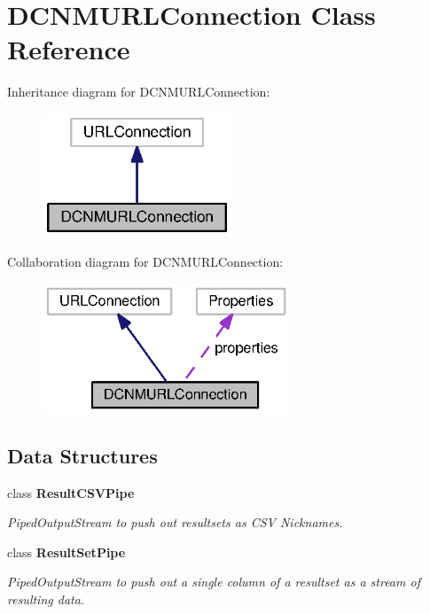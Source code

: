 \section{D\+C\+N\+M\+U\+R\+L\+Connection Class Reference}
\label{classorg_1_1smallfoot_1_1parser_1_1dcnm_1_1DCNMURLConnection}


Inheritance diagram for D\+C\+N\+M\+U\+R\+L\+Connection\+:
\nopagebreak
\begin{figure}[H]
\begin{center}
\leavevmode
\includegraphics[width=160pt]{classorg_1_1smallfoot_1_1parser_1_1dcnm_1_1DCNMURLConnection__inherit__graph}
\end{center}
\end{figure}


Collaboration diagram for D\+C\+N\+M\+U\+R\+L\+Connection\+:
\nopagebreak
\begin{figure}[H]
\begin{center}
\leavevmode
\includegraphics[width=209pt]{classorg_1_1smallfoot_1_1parser_1_1dcnm_1_1DCNMURLConnection__coll__graph}
\end{center}
\end{figure}
\subsection*{Data Structures}
\begin{DoxyCompactItemize}
\item 
class {\bfseries Result\+C\+S\+V\+Pipe}
\begin{DoxyCompactList}\small\item\em Piped\+Output\+Stream to push out resultsets as C\+S\+V Nicknames. \end{DoxyCompactList}\item 
class {\bfseries Result\+Set\+Pipe}
\begin{DoxyCompactList}\small\item\em Piped\+Output\+Stream to push out a single column of a resultset as a stream of resulting data. \end{DoxyCompactList}\end{DoxyCompactItemize}
